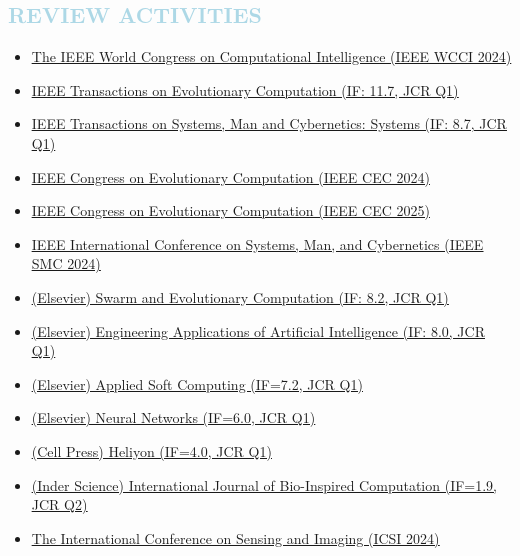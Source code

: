 \documentclass[11pt,a4paper,sans]{moderncv}
\renewcommand{\underline}[1]{\uline{#1}}
\begin{document}
{\subsection{\textcolor{lightblue}{REVIEW ACTIVITIES}}
{\begin{itemize}[label=\textbullet]
      \item {\color{orange}\href{https://2024.ieeewcci.org/}{\underline{The IEEE World Congress on Computational Intelligence (IEEE WCCI 2024)}}}
      \item {\color{orange}\href{https://ieeexplore.ieee.org/xpl/RecentIssue.jsp?punumber=4235}{\underline{IEEE Transactions on Evolutionary Computation (IF: 11.7, JCR Q1)}}}
      \item {\color{orange}\href{https://ieeexplore.ieee.org/xpl/RecentIssue.jsp?punumber=6221021}{\underline{IEEE Transactions on Systems, Man and Cybernetics: Systems (IF: 8.7, JCR Q1)}}}
      \item {\color{orange}\href{https://2024.ieeewcci.org/}{\underline{IEEE Congress on Evolutionary Computation (IEEE CEC 2024)}}}
      \item {\color{orange}\href{https://www.cec2025.org/index/page.html?id=1302}{\underline{IEEE Congress on Evolutionary Computation (IEEE CEC 2025)}}}
      \item {\color{orange}\href{https://www.ieeesmc2024.org/home}{\underline{IEEE International Conference on Systems, Man, and Cybernetics (IEEE SMC 2024)}}}
      \item {\color{orange}\href{https://www.sciencedirect.com/journal/swarm-and-evolutionary-computation}{\underline{(Elsevier) Swarm and Evolutionary Computation (IF: 8.2, JCR Q1)}}}
      \item {\color{orange}\href{https://www.sciencedirect.com/journal/engineering-applications-of-artificial-intelligence}{\underline{(Elsevier) Engineering Applications of Artificial Intelligence (IF: 8.0, JCR Q1)}}}
      \item {\color{orange}\href{https://www.sciencedirect.com/journal/applied-soft-computing}{\underline{(Elsevier) Applied Soft Computing (IF=7.2, JCR Q1)}}}
      \item {\color{orange}\href{https://www.sciencedirect.com/journal/neural-networks}{\underline{(Elsevier) Neural Networks (IF=6.0, JCR Q1)}}}
      \item {\color{orange}\href{https://www.sciencedirect.com/journal/heliyon}{\underline{(Cell Press) Heliyon (IF=4.0, JCR Q1)}}}
      \item {\color{orange}\href{https://www.inderscience.com/jhome.php?jcode=ijbic}{\underline{(Inder Science) International Journal of Bio-Inspired Computation (IF=1.9, JCR Q2)}}}
      \item {\color{orange}\href{https://icsi2024.ustc.edu.cn/main.htm}{\underline{The International Conference on Sensing and Imaging (ICSI 2024)}}}
  \end{itemize}}
  
}
\end{document}
